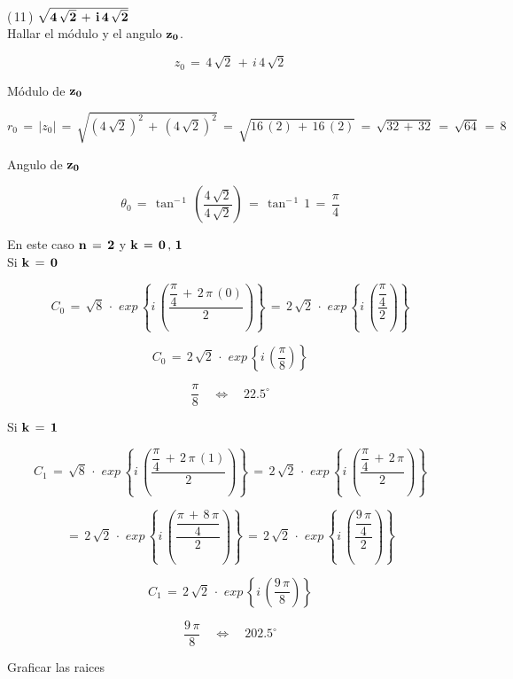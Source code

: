\documentclass[a4paper,11pt,openany]{book}
\begin{document}
\newpage

\textcolor{ao(english)}{(\,11\,)} $\bf{\sqrt{4\,\sqrt{2}\,+\,i\,4\,\sqrt{2}}}$\\

\textcolor{ao(english)}{} Hallar el módulo y el angulo $\bf{z_{0}}$.

$$z_{0}\,=\,4\,\sqrt{2}\,+\,i\,4\,\sqrt{2}$$

\textcolor{ao(english)}{} Módulo de $\bf{z_{0}}$

$$r_{0}\,=\,|z_{0}|\,=\,\sqrt{\left(4\,\sqrt{2}\right)^{2}\,+\,\left(4\,\sqrt{2}\right)^{2}}\,=\,\sqrt{16\,(2)\,+\,16\,(2)}\,=\,\sqrt{32\,+\,32}\,=\,\sqrt{64}\,=\,8$$

\textcolor{ao(english)}{} Angulo de $\bf{z_{0}}$

$$\theta_{0}\,=\,\tan^{-\,1}\,\left(\dfrac{4\,\sqrt{2}}{4\,\sqrt{2}}\right)\,=\,\tan^{-\,1}\,1\,=\,\dfrac{\pi}{4}$$

\textcolor{ao(english)}{} En este caso $\bf{n\,=\,2}$ y $\bf{k\,=\,0\,,\,1}$\\

\textcolor{ao(english)}{} Si $\bf{k\,=\,0}$

$$C_{0}\,=\,\sqrt{8}\,\cdot\,\,exp\,\left\{i\,\left(\dfrac{\dfrac{\pi}{4}\,+\,2\,\pi\,(0)}{2}\right)\right\}\,=\,2\,\sqrt{2}\,\cdot\,\,exp\,\left\{i\,\left(\dfrac{\dfrac{\pi}{4}}{2}\right)\right\}$$

$$C_{0}\,=\,2\,\sqrt{2}\,\cdot\,\,exp\,\left\{i\,\left(\dfrac{\pi}{8}\right)\right\}$$

$$\dfrac{\pi}{8} \quad\iff\quad 22.5^\circ$$

\textcolor{ao(english)}{} Si $\bf{k\,=\,1}$

$$C_{1}\,=\,\sqrt{8}\,\cdot\,\,exp\,\left\{i\,\left(\dfrac{\dfrac{\pi}{4}\,+\,2\,\pi\,(1)}{2}\right)\right\}\,=\,2\,\sqrt{2}\,\cdot\,\,exp\,\left\{i\,\left(\dfrac{\dfrac{\pi}{4}\,+\,2\,\pi}{2}\right)\right\}$$

$$=\,2\,\sqrt{2}\,\cdot\,\,exp\,\left\{i\,\left(\dfrac{\dfrac{\pi\,+\,8\,\pi}{4}}{2}\right)\right\}\,=\,2\,\sqrt{2}\,\cdot\,\,exp\,\left\{i\,\left(\dfrac{\dfrac{9\,\pi}{4}}{2}\right)\right\}$$

$$C_{1}\,=\,2\,\sqrt{2}\,\cdot\,\,exp\,\left\{i\,\left(\dfrac{9\,\pi}{8}\right)\right\}$$

$$\dfrac{9\,\pi}{8} \quad\iff\quad 202.5^\circ$$

\newpage

\textcolor{ao(english)}{} Graficar las raices
\end{document}
